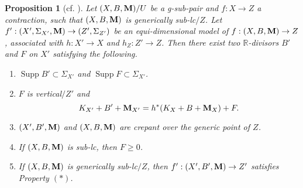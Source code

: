 \documentclass[11pt]{amsart}
\numberwithin{equation}{section}
\newcommand{\Mm}{{\bf{M}}}
\newcommand{\Rr}{\mathbb{R}}
\newcommand{\Supp}{\operatorname{Supp}}
\newtheorem{prop}[thm]{Proposition}
\theoremstyle{definition}
\theoremstyle{definition}
\theoremstyle{definition}
\begin{document}
\begin{prop}[cf. {\cite[Proposition 2.17]{ACSS21}}]\label{prop: weak ss imply *}
Let $(X,B,\Mm)/U$ be a g-sub-pair and $f: X\rightarrow Z$ a contraction, such that $(X,B,\Mm)$ is generically sub-lc$/Z$. Let $f': (X',\Sigma_{X'},\Mm)\rightarrow (Z',\Sigma_{Z'})$ be an equi-dimensional model of $f: (X,B,\Mm)\rightarrow Z$, associated with $h: X'\rightarrow X$ and $h_Z: Z'\rightarrow Z$. Then there exist two $\Rr$-divisors $B'$ and $F$ on $X'$ satisfying the following.
\begin{enumerate}
\item $\Supp B'\subset\Sigma_{X'}$ and $\Supp F\subset\Sigma_{X'}$.
\item $F$ is vertical$/Z'$ and
$$K_{X'}+B'+\Mm_{X'}=h^*(K_X+B+\Mm_X)+F.$$
\item $(X',B',\Mm)$ and $(X,B,\Mm)$ are crepant over the generic point of $Z$.
\item If $(X,B,\Mm)$ is sub-lc, then $F\geq 0$.
\item If $(X,B,\Mm)$ is generically sub-lc$/Z$, then $f': (X',B',\Mm)\rightarrow Z'$ satisfies Property $(*)$.
\end{enumerate}
\end{prop}
\end{document}
